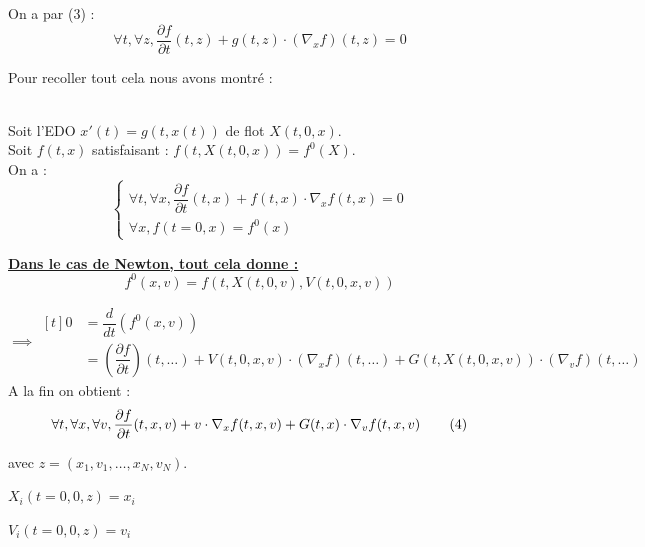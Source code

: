 \documentclass[12pt,a4paper]{article}
\begin{document}
	
	On a par (3) :
	\[
	\forall t,\forall z, \dfrac{\partial f}{\partial t}(t,z) + g(t,z) \cdot \left(\nabla_xf\right)(t,z) = 0
	\]
	
	Pour recoller tout cela nous avons montré :
	\begin{thm}$ $\\
		Soit l'EDO $x'(t) = g(t,x(t))$ de flot $X(t,0,x)$.\\
		Soit $f(t,x)$ satisfaisant  : $f(t,X(t,0,x)) = f^0(X)$.\\
		On a :
		\[
		\begin{cases}
			\forall t, \forall x, \dfrac{\partial f}{\partial t}(t,x)+f(t,x)\cdot\nabla_x f(t,x) = 0\\
			\forall x, f(t=0,x) = f^0(x)
		\end{cases}
		\]
	\end{thm}
	
	
	\textbf{\underline{Dans le cas de Newton, tout cela donne : }}
	\[f^0(x,v) = f(t,X(t,0,v),V(t,0,x,v))\]
	
	$\implies \begin{aligned}[t]
		0
		&= \dfrac{d}{dt}(f^0(x,v))\\
		&= \left(\dfrac{\partial f}{\partial t}\right)(t,\ldots) + V(t,0,x,v)\cdot\left(\nabla_x f\right)(t,\ldots) + G(t,X(t,0,x,v))\cdot\left(\nabla_v f\right)(t,\ldots)
	\end{aligned}$\\
	
	A la fin on obtient :
	\[
	\forall t, \forall x, \forall v, \dfrac{\partial f}{\partial t}(t,x,v)+v\cdot\nabla_xf(t,x,v) + G(t,x)\cdot\nabla_v f(t,x,v) \text{ \hspace{.5cm} (4)}
	\]
	
	avec $z = (x_1,v_1,\ldots,x_N,v_N)$.
	
	$X_i(t=0,0,z) = x_i$
	
	$V_i(t=0,0,z) = v_i$
	
\end{document}
